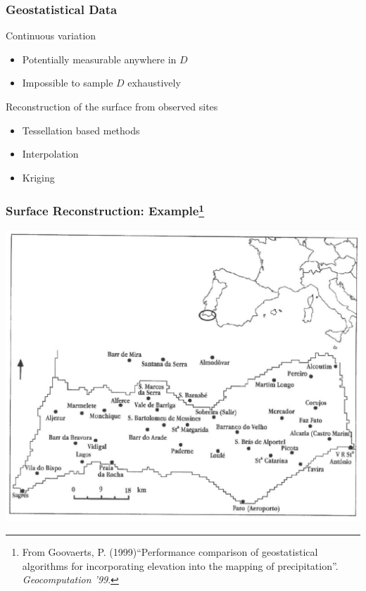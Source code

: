 \documentclass[nototal]{beamer}
\begin{document}
 \begin{frame}[<+->]
   \frametitle{Geostatistical Data}
   \begin{block}{Continuous variation}
     \begin{itemize}
       \item Potentially measurable anywhere in $D$
       \item Impossible to sample $D$ exhaustively
     \end{itemize}
    \end{block}
\begin{block}{Reconstruction of the surface from observed sites}
     \begin{itemize}
       \item Tessellation based methods
       \item Interpolation
       \item Kriging
     \end{itemize}
    \end{block}
  \end{frame}
  \begin{frame}
    \frametitle{Surface Reconstruction: Example\footnote{From Goovaerts, P.
    (1999)``Performance comparison of geostatistical algorithms for
    incorporating elevation into the mapping of precipitation''.
    \emph{Geocomputation '99}.}}
    \begin{center}
      \includegraphics[width=.65\linewidth]{pg1.jpg}
    \end{center}
  \end{frame}
\end{document}
